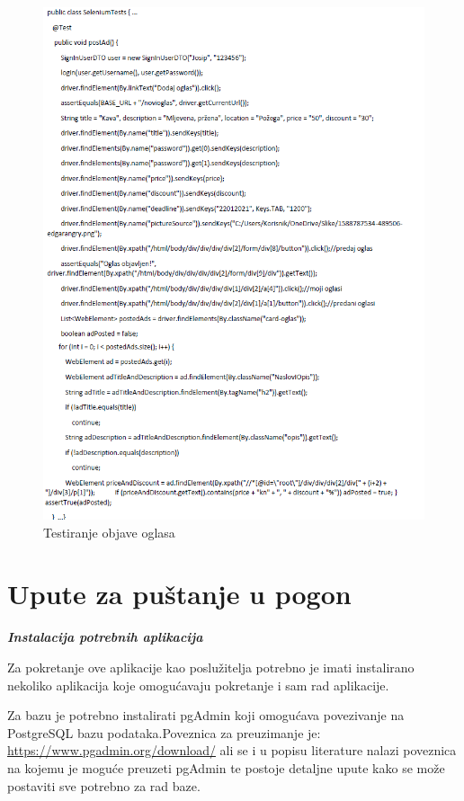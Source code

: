 			\begin{figure}[H]
				\includegraphics[scale=0.9]{slike/sel5.PNG} %
				\centering
				\caption{Testiranje objave oglasa}
				\label{fig:sel5}
			\end{figure}
			
			\eject 
		
		\section{Upute za puštanje u pogon}
		
			\textbf{\textit{Instalacija potrebnih aplikacija}}
			
			Za pokretanje ove aplikacije kao poslužitelja potrebno je imati instalirano nekoliko aplikacija koje omogućavaju pokretanje i sam rad aplikacije.
		
			Za bazu je potrebno instalirati pgAdmin koji omogućava povezivanje na PostgreSQL bazu podataka.Poveznica za preuzimanje je: \url{https://www.pgadmin.org/download/} ali se i u  popisu literature nalazi poveznica na kojemu je moguće preuzeti pgAdmin te postoje detaljne upute kako se može postaviti sve potrebno za rad baze.
		
